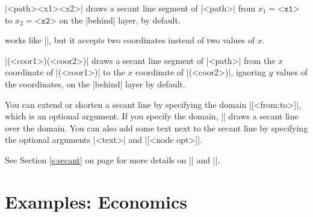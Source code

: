 \icmd{\tzsecantat}|{<path>}{<x1>}{<x2>}| draws a secant line segment of |<path>| from $x_1=\texttt{<x1>}$ to $x_2=\texttt{<x2>}$ on the |behind| layer, by default.

\begin{tzcode}{.3}
\end{tzcode}

\icmd{\tzsecant} works like |\tzsecantat|, but it accepts two coordinates instead of two values of $x$.

|(<coor1>)(<coor2>)| draws a secant line segment of |<path>| from the $x$ coordinate of |(<coor1>)| to the $x$ coordinate of |(<coor2>)|, ignoring $y$ values of the coordinates, on the |behind| layer by default.

\begin{tzcode}{.3}
\end{tzcode}


You can extend or shorten a secant line by specifying the domain |[<from:to>]|, which is an optional argument.
If you specify the domain, |\tzsecant| draws a secant line over the domain.
You can also add some text next to the secant line by specifying the optional arguments |{<text>}| and |[<node opt>]|.

\begin{tzcode}{.3}
\end{tzcode}

See Section \ref{s:secant} on page \pageref{s:secant} for more details on |\tzsecant| and |\tzsecantat|.

\chapter{Examples: Economics}
\label{ci:examples}

